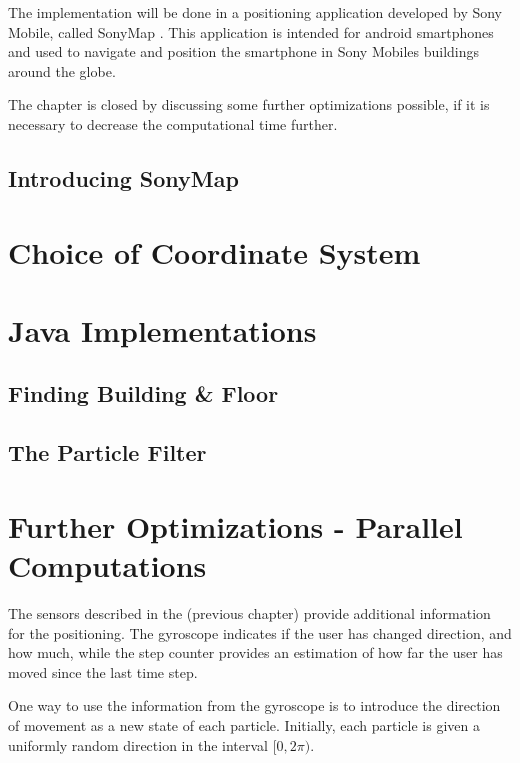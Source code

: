 \documentclass{LTHthesis}
\begin{document}
The implementation will be done in a positioning application developed by Sony Mobile, called SonyMap \cite{sonymap}. This application is intended for android smartphones and used to navigate and position the smartphone in Sony Mobiles buildings around the globe. 

The chapter is closed by discussing some further optimizations possible, if it is necessary to decrease the computational time further. 
%
\subsection{Introducing SonyMap}
%
\section{Choice of Coordinate System}
%
\section{Java Implementations}
%
\subsection{Finding Building \& Floor}
%
\subsection{The Particle Filter}
%
\section{Further Optimizations - Parallel Computations}
%


The sensors described in the (previous chapter) provide additional information for the positioning. The gyroscope indicates  if the user has changed direction, and how much, while the step counter provides an estimation of how far the user has moved since the last time step.

One way to use the information from the gyroscope is to introduce the direction of movement as a new state of each particle. Initially, each particle is given a uniformly random direction in the interval $[0,2 \pi)$. 

\printbibliography  %
\end{document}
